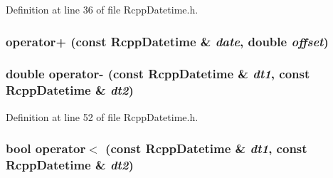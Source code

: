 Definition at line 36 of file RcppDatetime.h.\hypertarget{classRcppDatetime_a29513e04f8cb90b2a7efea97f8cbd37a}{
\subsubsection[{operator+}]{ operator+ (const {\bf RcppDatetime} \& {\em date}, \/  double {\em offset})}}
\label{classRcppDatetime_a29513e04f8cb90b2a7efea97f8cbd37a}
\hypertarget{classRcppDatetime_a946df17f9ce3c423518d0db74e2bbbc4}{
\subsubsection[{operator-\/}]{\setlength{\rightskip}{0pt plus 5cm}double operator-\/ (const {\bf RcppDatetime} \& {\em dt1}, \/  const {\bf RcppDatetime} \& {\em dt2})}}
\label{classRcppDatetime_a946df17f9ce3c423518d0db74e2bbbc4}


Definition at line 52 of file RcppDatetime.h.\hypertarget{classRcppDatetime_a142f9346629bf7a6f673ba05d9338cf3}{
\subsubsection[{operator$<$}]{\setlength{\rightskip}{0pt plus 5cm}bool operator$<$ (const {\bf RcppDatetime} \& {\em dt1}, \/  const {\bf RcppDatetime} \& {\em dt2})}}
\label{classRcppDatetime_a142f9346629bf7a6f673ba05d9338cf3}


